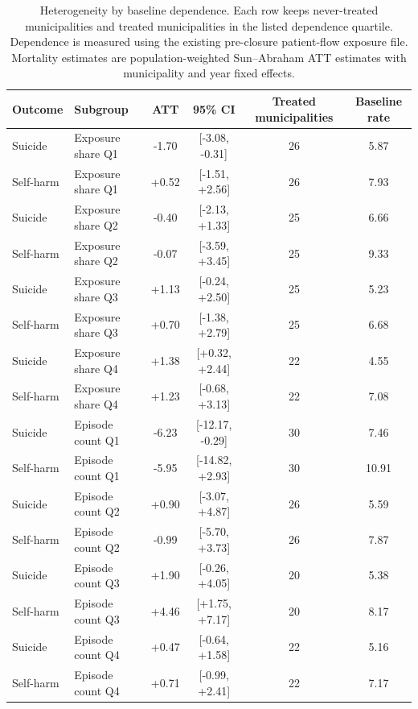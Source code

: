 \begin{table}[!htbp]\centering
\caption{Heterogeneity by baseline dependence. Each row keeps never-treated municipalities and treated municipalities in the listed dependence quartile. Dependence is measured using the existing pre-closure patient-flow exposure file. Mortality estimates are population-weighted Sun--Abraham ATT estimates with municipality and year fixed effects.}
\label{tab:heterogeneity-dependence-revision}
\small
\begin{tabular}{llcccc}
\toprule
Outcome & Subgroup & ATT & 95\% CI & Treated municipalities & Baseline rate \\
\midrule
Suicide & Exposure share Q1 & -1.70 & [-3.08, -0.31] & 26 & 5.87 \\
Self-harm & Exposure share Q1 & +0.52 & [-1.51, +2.56] & 26 & 7.93 \\
Suicide & Exposure share Q2 & -0.40 & [-2.13, +1.33] & 25 & 6.66 \\
Self-harm & Exposure share Q2 & -0.07 & [-3.59, +3.45] & 25 & 9.33 \\
Suicide & Exposure share Q3 & +1.13 & [-0.24, +2.50] & 25 & 5.23 \\
Self-harm & Exposure share Q3 & +0.70 & [-1.38, +2.79] & 25 & 6.68 \\
Suicide & Exposure share Q4 & +1.38 & [+0.32, +2.44] & 22 & 4.55 \\
Self-harm & Exposure share Q4 & +1.23 & [-0.68, +3.13] & 22 & 7.08 \\
Suicide & Episode count Q1 & -6.23 & [-12.17, -0.29] & 30 & 7.46 \\
Self-harm & Episode count Q1 & -5.95 & [-14.82, +2.93] & 30 & 10.91 \\
Suicide & Episode count Q2 & +0.90 & [-3.07, +4.87] & 26 & 5.59 \\
Self-harm & Episode count Q2 & -0.99 & [-5.70, +3.73] & 26 & 7.87 \\
Suicide & Episode count Q3 & +1.90 & [-0.26, +4.05] & 20 & 5.38 \\
Self-harm & Episode count Q3 & +4.46 & [+1.75, +7.17] & 20 & 8.17 \\
Suicide & Episode count Q4 & +0.47 & [-0.64, +1.58] & 22 & 5.16 \\
Self-harm & Episode count Q4 & +0.71 & [-0.99, +2.41] & 22 & 7.17 \\
\bottomrule
\end{tabular}
\end{table}
